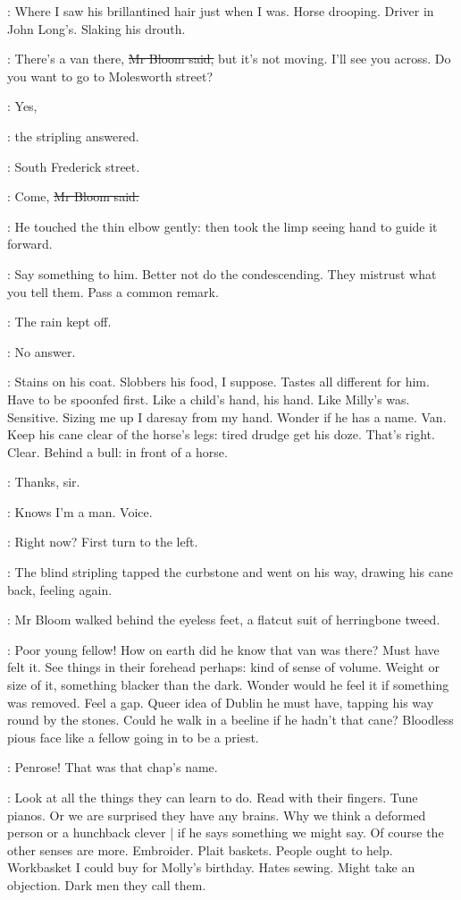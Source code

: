 \BloomInt:
Where I saw his brillantined hair just when I was.
Horse drooping.
Driver in John Long's.
Slaking his drouth.

\Bloom:
There's a van there,
\sout{Mr Bloom said,}
but it's not moving.
I'll see you across.
Do you want to go to Molesworth street?

\stripling:
Yes,

:
the stripling answered.

\stripling:
South Frederick street.

\Bloom:
Come,
\sout{Mr Bloom said.}

:
He touched the thin elbow gently:
then took the limp seeing hand to guide it forward.

\BloomInt:
Say something to him.
Better not do the condescending.
They mistrust what you tell them.
Pass a common remark.

\Bloom:
The rain kept off.

\BloomInt:
No answer.

\BloomInt:
Stains on his coat.
Slobbers his food, I suppose.
Tastes all different for him.
Have to be spoonfed first.
Like a child's hand, his hand.
Like Milly's was.
Sensitive.
Sizing me up I daresay from my hand.
Wonder if he has a name.
Van.
Keep his cane clear of the horse's legs:
tired drudge get his doze.
That's right.
Clear.
Behind a bull:
in front of a horse.

\stripling:
Thanks, sir.

\BloomInt:
Knows I'm a man.
Voice.

\Bloom:
Right now?
First turn to the left.

:
The blind stripling tapped the curbstone and went on his way,
drawing his cane back,
feeling again.

:
Mr Bloom walked behind the eyeless feet,
a flatcut suit of herringbone tweed.

\BloomInt:
Poor young fellow!
How on earth did he know that van was there?
Must have felt it.
See things in their forehead perhaps:
kind of sense of volume.
Weight or size of it,
something blacker than the dark.
Wonder would he feel it if something was removed.
Feel a gap.
Queer idea of Dublin he must have,
tapping his way round by the stones.
Could he walk in a beeline if he hadn't that cane?
Bloodless pious face like a fellow going in to be a priest.

\BloomInt:
Penrose!
That was that chap's name.

\BloomInt:
Look at all the things they can learn to do.
Read with their fingers.
Tune pianos.
Or we are surprised they have any brains.
Why we think a deformed person or a hunchback clever |
if he says something we might say.
Of course the other senses are more.
Embroider.
Plait baskets.
People ought to help.
Workbasket I could buy for Molly's birthday.
Hates sewing.
Might take an objection.
Dark men they call them.

